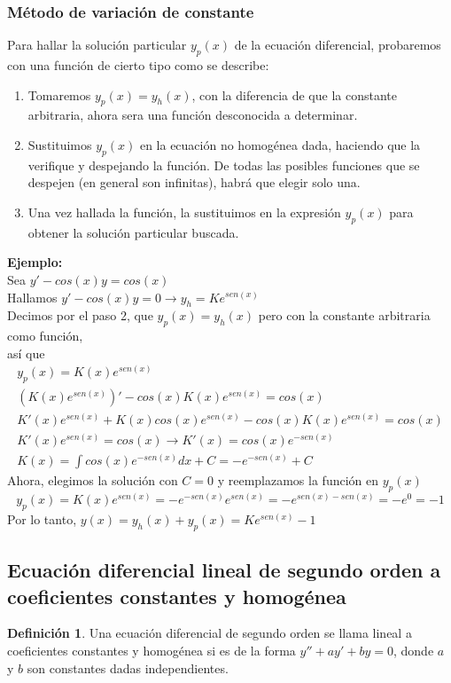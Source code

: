 \documentclass[10pt]{article}
\theoremstyle{definition}
\newtheorem{definition}{Definición}[section]
\begin{document}
\subsubsection{Método de variación de constante}
Para hallar la solución particular $y_p(x)$ de la ecuación diferencial, probaremos  con una función de cierto tipo como se describe:
\begin{enumerate}
	\item Tomaremos $y_p(x)=y_h(x)$, con la diferencia de que la constante arbitraria, ahora sera una función desconocida a determinar.
	\item Sustituimos $y_p(x)$ en la ecuación no homogénea dada, haciendo que la verifique y despejando la función. De todas las posibles funciones que se despejen (en general son infinitas), habrá que elegir solo una.
	\item Una vez hallada la función, la sustituimos en la expresión $y_p(x)$ para obtener la solución particular buscada.
\end{enumerate}
\textbf{Ejemplo:}\\
Sea $y'-cos(x)y=cos(x)$\\
Hallamos $y'-cos(x)y=0 \rightarrow y_h=Ke^{sen(x)}$\\
Decimos por el paso 2, que $y_p(x)=y_h(x)$ pero con la constante arbitraria como función,\\ así que
$$\begin{array}{l}
		y_p(x)=K(x)e^{sen(x)}                                            \\
		(K(x)e^{sen(x)})'-cos(x)K(x)e^{sen(x)}=cos(x)                    \\
		K'(x)e^{sen(x)}+K(x)cos(x)e^{sen(x)}-cos(x)K(x)e^{sen(x)}=cos(x) \\
		K'(x)e^{sen(x)}=cos(x)\rightarrow K'(x)=cos(x)e^{-sen(x)}        \\
		K(x)=\int cos(x)e^{-sen(x)}dx+C=-e^{-sen(x)}+C
	\end{array}$$
Ahora, elegimos la solución con $C=0$ y reemplazamos la función en $y_p(x)$
$$y_p(x)=K(x)e^{sen(x)}=-e^{-sen(x)}e^{sen(x)}=-e^{sen(x)-sen(x)}=-e^0=-1$$
Por lo tanto, $y(x)=y_h(x)+y_p(x)=Ke^{sen(x)}-1$
\newpage \subsection{Ecuación diferencial lineal de segundo orden a coeficientes constantes y homogénea}
\begin{definition}
	Una ecuación diferencial de segundo orden se llama lineal a coeficientes constantes y homogénea si es de la forma $y''+ay'+by=0$, donde $a$ y $b$ son constantes dadas independientes.
\end{definition}
\end{document}
